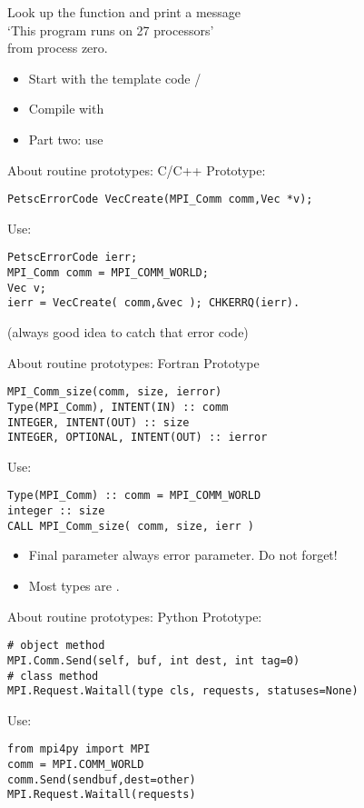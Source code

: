 \begin{exerciseframe}[hello]
Look up the function  and print a message\\
`This program runs on 27 processors'\\
from process zero.

\begin{itemize}
\item Start with the template code /
\item Compile with 
\item Part two: use 
\end{itemize}
\end{exerciseframe}


\begin{frame}[containsverbatim]{About routine prototypes: C/C++}
  \label{sec:protos}
Prototype:
\begin{verbatim}
PetscErrorCode VecCreate(MPI_Comm comm,Vec *v);
\end{verbatim}
Use:
\begin{verbatim}
PetscErrorCode ierr;
MPI_Comm comm = MPI_COMM_WORLD;
Vec v;
ierr = VecCreate( comm,&vec ); CHKERRQ(ierr).
\end{verbatim}
(always good idea to catch that error code)
\end{frame}

\begin{frame}[containsverbatim]{About routine prototypes: Fortran}
Prototype
\begin{verbatim}
MPI_Comm_size(comm, size, ierror)
Type(MPI_Comm), INTENT(IN) :: comm
INTEGER, INTENT(OUT) :: size
INTEGER, OPTIONAL, INTENT(OUT) :: ierror
\end{verbatim}
Use:
\begin{verbatim}
Type(MPI_Comm) :: comm = MPI_COMM_WORLD
integer :: size
CALL MPI_Comm_size( comm, size, ierr )
\end{verbatim}
\begin{itemize}
\item Final parameter always error parameter. Do not forget!
\item Most  types are .
\end{itemize}
\end{frame}

\begin{frame}[containsverbatim]{About routine prototypes: Python}
Prototype:
\begin{verbatim}
# object method
MPI.Comm.Send(self, buf, int dest, int tag=0)
# class method
MPI.Request.Waitall(type cls, requests, statuses=None)
\end{verbatim}
Use:
\begin{verbatim}
from mpi4py import MPI
comm = MPI.COMM_WORLD
comm.Send(sendbuf,dest=other)
MPI.Request.Waitall(requests)
\end{verbatim}
\end{frame}



